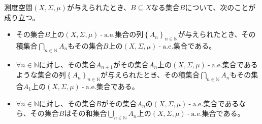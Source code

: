 \documentclass[dvipdfmx]{jsarticle}
\begin{document}
\begin{thm}\label{4.6.3.2}
測度空間$(X,\varSigma,\mu)$が与えられたとき、$B \subseteq X$なる集合$B$について、次のことが成り立つ。
\begin{itemize}
\item
  その集合$B$上の$(X,\varSigma,\mu) \ \text{-} \ \mathrm{a.e.}$集合の列$\left\{ A_{n} \right\}_{n \in \mathbb{N}}$が与えられたとき、その積集合$\bigcap_{n \in \mathbb{N}} A_{n}$もその集合$B$上の$(X,\varSigma,\mu) \ \text{-} \ \mathrm{a.e.}$集合である。
\item
  $\forall n \in \mathbb{N}$に対し、その集合$A_{n + 1}$がその集合$A_{n}$上の$(X,\varSigma,\mu) \ \text{-} \ \mathrm{a.e.}$集合であるような集合の列$\left\{ A_{n} \right\}_{n \in \mathbb{N}}$が与えられたとき、その積集合$\bigcap_{n \in \mathbb{N}} A_{n}$もその集合$A_{1}$上の$(X,\varSigma,\mu) \ \text{-} \ \mathrm{a.e.}$集合である。
\item
  $\forall n \in \mathbb{N}$に対し、その集合$B$がその集合$A_{n}$の$(X,\varSigma,\mu) \ \text{-} \ \mathrm{a.e.}$集合であるなら、その集合$B$はその和集合$\bigcup_{n \in \mathbb{N}} A_{n}$上の$(X,\varSigma,\mu) \ \text{-} \ \mathrm{a.e.}$集合である。
\end{itemize}
\end{thm}
\end{document}
